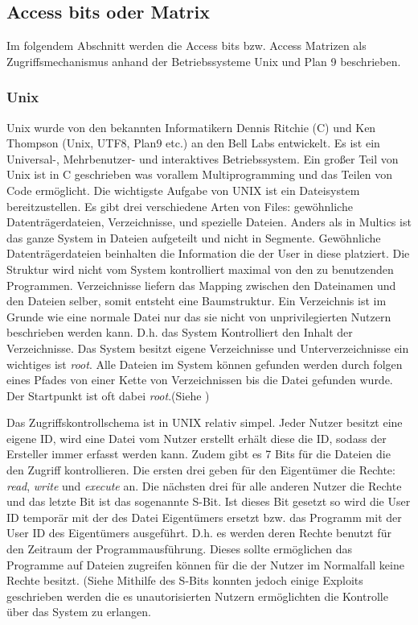 \documentclass[11pt,technote]{IEEEtran}
\begin{document}
    \subsection{Access bits oder Matrix} \label{sec:secure:access}
      Im folgendem Abschnitt werden die Access bits bzw. Access Matrizen als Zugriffsmechanismus anhand der Betriebssysteme Unix und Plan 9 beschrieben.
      \subsubsection{Unix}
		    Unix wurde von den bekannten Informatikern Dennis Ritchie (C) und Ken Thompson (Unix, UTF8, Plan9 etc.) an den Bell Labs entwickelt.
		    Es ist ein Universal-, Mehrbenutzer- und interaktives Betriebssystem. Ein gro\ss er Teil von Unix ist in C geschrieben was vorallem Multiprogramming
		    und das Teilen von Code erm\"oglicht. Die wichtigste Aufgabe von UNIX ist ein Dateisystem bereitzustellen. Es gibt drei verschiedene Arten von Files:
		    gew\"ohnliche Datentr\"agerdateien, Verzeichnisse, und spezielle Dateien. Anders als in Multics ist das ganze System in Dateien aufgeteilt und nicht in
		    Segmente. Gew\"ohnliche Datentr\"agerdateien beinhalten die Information die der User in diese platziert. Die Struktur wird nicht vom System kontrolliert maximal
		    von den zu benutzenden Programmen. Verzeichnisse liefern das Mapping zwischen den Dateinamen und den Dateien selber, somit entsteht eine Baumstruktur.
		    Ein Verzeichnis ist im Grunde wie eine normale Datei nur das sie nicht von unprivilegierten Nutzern beschrieben werden kann. D.h. das System Kontrolliert den
		    Inhalt der Verzeichnisse. Das System besitzt eigene Verzeichnisse und Unterverzeichnisse ein wichtiges ist \textit{root}.
		    Alle Dateien im System k\"onnen gefunden werden durch folgen eines Pfades von einer Kette von Verzeichnissen bis die Datei gefunden wurde. 
		    Der Startpunkt ist oft dabei \textit{root}.(Siehe \cite[S. 366]{inproc:unix})
		    
		    Das Zugriffskontrollschema ist in UNIX relativ simpel. Jeder Nutzer besitzt eine eigene ID, wird eine Datei vom Nutzer erstellt  erh\"alt diese die ID, sodass der Ersteller immer
		    erfasst werden kann. Zudem gibt es 7 Bits f\"ur die Dateien die den Zugriff kontrollieren. 
		    Die ersten drei geben f\"ur den Eigent\"umer die Rechte: \textit{read}, \textit{write} und \textit{execute} an.
		    Die n\"achsten drei f\"ur alle anderen Nutzer die Rechte und das letzte Bit ist das sogenannte S-Bit. Ist dieses Bit gesetzt so wird die User ID tempor\"ar
		    mit der des Datei Eigent\"umers ersetzt bzw. das Programm mit der User ID des Eigent\"umers ausgef\"uhrt.
		    D.h. es werden deren Rechte benutzt f\"ur den Zeitraum der Programmausf\"uhrung. Dieses sollte erm\"oglichen das Programme
		    auf Dateien zugreifen k\"onnen f\"ur die der Nutzer im Normalfall keine Rechte besitzt. (Siehe \cite[S. 367]{inproc:unix}    
		    Mithilfe des S-Bits konnten jedoch einige Exploits geschrieben werden die es unautorisierten Nutzern erm\"oglichten
		    die Kontrolle \"uber das System zu erlangen. 
		    
\end{document}
